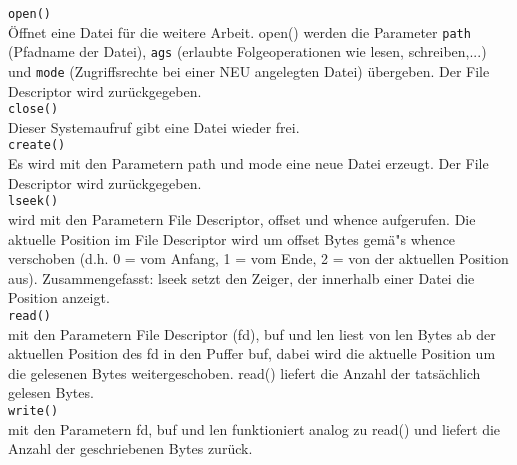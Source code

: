 \begin{answer}
  \texttt{open()}\\
  Öffnet eine Datei für die weitere Arbeit. open() werden die Parameter \texttt{path} (Pfadname der Datei),
  \texttt{ags} (erlaubte Folgeoperationen wie lesen, schreiben,...) und \texttt{mode} (Zugriffsrechte bei einer NEU
  angelegten Datei) übergeben. Der File Descriptor wird zurückgegeben.
  \\

  \texttt{close()}\\
  Dieser Systemaufruf gibt eine Datei wieder frei.
  \\

  \texttt{create()}\\
  Es wird mit den Parametern path und mode eine neue Datei erzeugt. Der File Descriptor wird
  zurückgegeben.
  \\

  \texttt{lseek()}\\
  wird mit den Parametern File Descriptor, offset und whence aufgerufen. Die aktuelle Position im
  File Descriptor wird um offset Bytes gemä"s whence verschoben (d.h. 0 = vom Anfang, 1 = vom
  Ende, 2 = von der aktuellen Position aus).
  Zusammengefasst: lseek setzt den Zeiger, der innerhalb einer Datei die Position anzeigt.
  \\

  \texttt{read()}\\
  mit den Parametern File Descriptor (fd), buf und len liest von len Bytes ab der aktuellen Position
  des fd in den Puffer buf, dabei wird die aktuelle Position um die gelesenen Bytes weitergeschoben.
  read() liefert die Anzahl der tatsächlich gelesen Bytes.
  \\

  \texttt{write()}\\
  mit den Parametern fd, buf und len funktioniert analog zu read() und liefert die Anzahl der geschriebenen
  Bytes zurück.
\end{answer}

